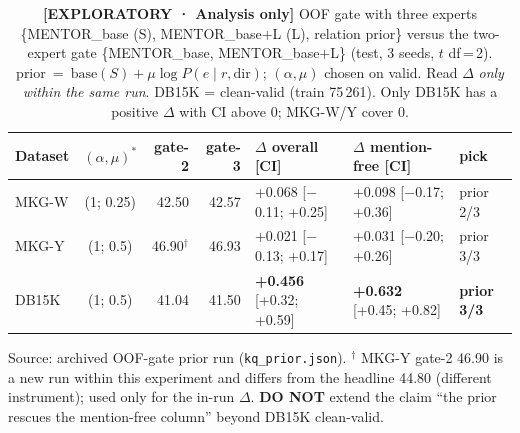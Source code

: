 \begin{table}[t]
\centering
\footnotesize
\caption{\textbf{[EXPLORATORY · Analysis only]} OOF gate with three experts \{MENTOR\_base (S), MENTOR\_base+L (L), relation prior\} versus the two-expert gate \{MENTOR\_base, MENTOR\_base+L\} (test, 3 seeds, $t$ df\,=\,2). prior~=~$\text{base}(S) + \mu\log P(e\mid r,\text{dir})$; $(\alpha,\mu)$ chosen on valid. Read $\Delta$ \emph{only within the same run}. DB15K = clean-valid (train 75\,261). Only DB15K has a positive $\Delta$ with CI above 0; MKG-W/Y cover 0.}
\label{tab:prior_k3}
\begin{tabular}{l c r r l l l}
\toprule
Dataset & $(\alpha,\mu)^*$ & gate-2 & gate-3 & $\Delta$ overall [CI] & $\Delta$ mention-free [CI] & pick \\
\midrule
MKG-W & (1; 0.25) & 42.50 & 42.57 & +0.068 [$-$0.11; +0.25] & +0.098 [$-$0.17; +0.36] & prior 2/3 \\
MKG-Y & (1; 0.5)  & 46.90$^\dagger$ & 46.93 & +0.021 [$-$0.13; +0.17] & +0.031 [$-$0.20; +0.26] & prior 3/3 \\
DB15K & (1; 0.5)  & 41.04 & 41.50 & \textbf{+0.456} [+0.32; +0.59] & \textbf{+0.632} [+0.45; +0.82] & \textbf{prior 3/3} \\
\bottomrule
\end{tabular}

\vspace{2pt}
\begin{minipage}{\linewidth}\footnotesize\raggedright
Source: archived OOF-gate prior run (\texttt{kq\_prior.json}).
$^\dagger$ MKG-Y gate-2 46.90 is a new run within this experiment and differs from the headline 44.80 (different instrument); used only for the in-run $\Delta$.
\textbf{DO NOT} extend the claim ``the prior rescues the mention-free column'' beyond DB15K clean-valid.
\end{minipage}
\end{table}

